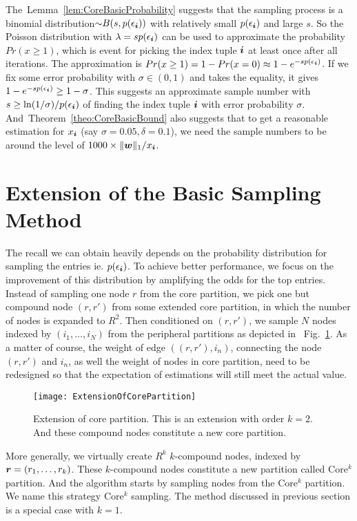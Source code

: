 \documentclass[10pt,journal,compsoc]{IEEEtran}
\newcommand{\V}[1]{{\boldsymbol{{\MakeLowercase{#1}}}}}
\newcommand{\norm}[2]{\|#1\|_{#2}}
\newcommand{\Fig}[1]{Fig.~\ref{fig:#1}}
\newcommand{\Lem}[1]{Lemma~\ref{lem:#1}}
\newcommand{\Theo}[1]{Theorem~\ref{theo:#1}}
\begin{document}
The~\Lem{CoreBasicProbability} suggests that the sampling process is a binomial distribution${\sim}B(s,p(\epsilon_{\V{i}}))$ with relatively small $p(\epsilon_{\V{i}})$ and large $s$. So the Poisson distribution with $\lambda = sp(\epsilon_{\V{i}})$ can be used to approximate the probability $Pr(x\geq 1)$, which is event for picking the index tuple $\V{i}$ at least once after all iterations. The approximation is $Pr(x\geq1) = 1-Pr(x=0)\approx 1-e^{-sp(\epsilon_{\V{i}})}$. If we fix some error probability with $\sigma \in (0,1)$ and takes the equality, it gives $1-e^{-sp(\epsilon_{\V{i}})} \geq 1-\sigma$. This suggests an approximate sample number with $s \geq \ln(1/\sigma)/p(\epsilon_{\V{i}})$ of finding the index tuple $\V{i}$ with error probability $\sigma$. And~\Theo{CoreBasicBound} also suggests that to get a reasonable estimation for $x_{\V{i}}$ (say $\sigma = 0.05,\delta=0.1$), we need the sample numbers to be around the level of $1000\times\norm{\V{w}}{1}/x_{\V{i}}$.

\section{Extension of the Basic Sampling Method}
The recall we can obtain heavily depends on the probability distribution for sampling the entries ie. $p(\epsilon_{\V{i}})$. To achieve better performance, we focus on the improvement of this distribution by amplifying the odds for the top entries. Instead of sampling one node $r$ from the core partition, we pick one but compound node $(r,r')$ from some extended core partition, in which the number of nodes is expanded to $R^2$. Then conditioned on $(r,r')$, we sample $N$ nodes indexed by $(i_1,\ldots,i_N)$ from the peripheral partitions as depicted in ~\Fig{ExtensionOfCorePartition}. As a matter of course, the weight of edge $((r,r'),i_n)$, connecting the node $(r,r')$ and $i_n$, as well the weight of nodes in core partition, need to be redesigned so that the expectation of estimations will still meet the actual value.

\begin{figure}[!ht]
	\centering
	\texttt{[image: ExtensionOfCorePartition]}
	\caption{Extension of core partition. This is an extension with order $k=2$. And these compound nodes constitute a new core partition.}
	\label{fig:ExtensionOfCorePartition}
\end{figure}

More generally, we virtually create $R^k$ $k$-compound nodes,
indexed by $\V{r}=(r_1,\ldots,r_k)$.
These $k$-compound nodes constitute a new partition called Core$^k$ partition. And the algorithm starts by sampling nodes from the Core$^k$ partition. We name this strategy Core$^k$ sampling. The method discussed in previous section is a special case with $k=1$. 
\end{document}
